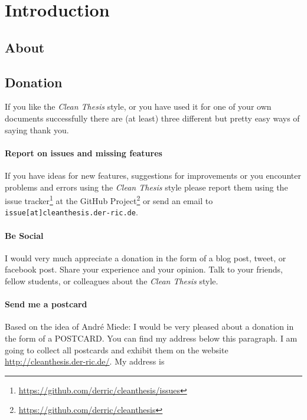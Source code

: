\documentclass{ltxdockit}
\newcommand*{\cleanthesis}{\emph{Clean Thesis}\xspace}
\newcommand*{\cthesishome}{http://cleanthesis.der-ric.de/}
\begin{document}
\printtitlepage
\tableofcontents
\listoftables

\section{Introduction}
\label{sec:intro}

\subsection[About]{About }
\label{sec:intro:about}

\subsection{Donation}
\label{sec:intro:donation}

If you like the \cleanthesis style, or you have used it for one of your own documents successfully there are (at least) three different but pretty easy ways of saying thank you.

\paragraph{Report on issues and missing features} If you have ideas for new features, suggestions for improvements or you encounter problems and errors using the \cleanthesis style please report them using the issue tracker\footnote{\url{https://github.com/derric/cleanthesis/issues}} at the GitHub Project\footnote{\url{https://github.com/derric/cleanthesis}} or send an email to \texttt{issue[at]cleanthesis.der-ric.de}.

\paragraph{Be Social} I would very much appreciate a donation in the form of a blog post, tweet, or facebook post. Share your experience and your opinion. Talk to your friends, fellow students, or colleagues about the \cleanthesis style.

\paragraph{Send me a postcard} Based on the idea of André Miede: I would be very pleased about a donation in the form of a POSTCARD. You can find my address below this paragraph. I am going to collect all postcards and exhibit them on the website \url{\cthesishome}. My address is
\end{document}
